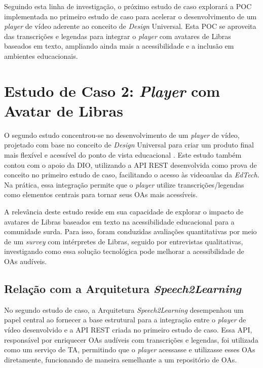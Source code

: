 Seguindo esta linha de investigação, o próximo estudo de caso explorará a POC implementada no primeiro estudo de caso para acelerar o desenvolvimento de um \textit{player} de vídeo aderente ao conceito de \textit{Design} Universal. Esta POC se aproveita das transcrições e legendas para integrar o \textit{player} com avatares de Libras baseados em texto, ampliando ainda mais a acessibilidade e a inclusão em ambientes educacionais.

\section{Estudo de Caso 2: \textit{Player} com Avatar de Libras}
\label{c4:cs2}

O segundo estudo concentrou-se no desenvolvimento de um \textit{player} de vídeo, projetado com base no conceito de \textit{Design} Universal para criar um produto final mais flexível e acessível do ponto de vista educacional \cite{UNESCO2023, GovBr2023}. Este estudo também contou com o apoio da DIO, utilizando a API REST desenvolvida como prova de conceito no primeiro estudo de caso, facilitando o acesso às videoaulas da \textit{EdTech}. Na prática, essa integração permite que o \textit{player} utilize transcrições/legendas como elementos centrais para tornar seus OAs mais acessíveis.

A relevância deste estudo reside em sua capacidade de explorar o impacto de avatares de Libras baseados em texto na acessibilidade educacional para a comunidade surda. Para isso, foram conduzidas avaliações quantitativas por meio de um \textit{survey} com intérpretes de Libras, seguido por entrevistas qualitativas, investigando como essa solução tecnológica pode melhorar a acessibilidade de OAs audíveis.

\subsection{Relação com a Arquitetura \textit{Speech2Learning}}

No segundo estudo de caso, a Arquitetura \textit{Speech2Learning} desempenhou um papel central ao fornecer a base estrutural para a integração entre o \textit{player} de vídeo desenvolvido e a API REST criada no primeiro estudo de caso. Essa API, responsável por enriquecer OAs audíveis com transcrições e legendas, foi utilizada como um serviço de TA, permitindo que o \textit{player} acessasse e utilizasse esses OAs diretamente, funcionando de maneira semelhante a um repositório de OAs.

